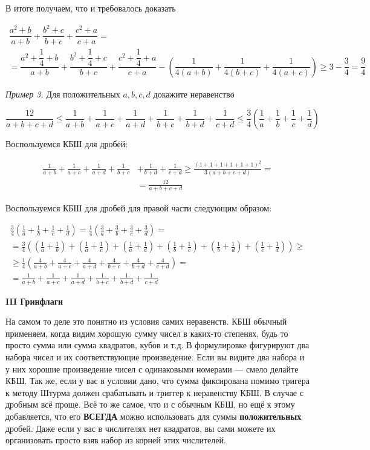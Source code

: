 В итоге получаем, что и требовалось доказать

$$
\begin{gathered}
\dfrac{a^2+b}{a+b}+\dfrac{b^2+c}{b+c}+\dfrac{c^2+a}{c+a}= \\
=\dfrac{a^2+\dfrac{1}{4}+b}{a+b}+\dfrac{b^2+\dfrac{1}{4}+c}{b+c}+\dfrac{c^2+\dfrac{1}{4}+a}{c+a}-\left(\dfrac{1}{4(a+b)}+\dfrac{1}{4(b+c)}+\dfrac{1}{4(a+c)}\right) \geqslant 3-\dfrac{3}{4}=\dfrac{9}{4}
\end{gathered}
$$

\textit{Пример 3.}
Для положительных $a, b, c, d$ докажите неравенство

$$
\frac{12}{a+b+c+d} \leqslant \frac{1}{a+b}+\frac{1}{a+c}+\frac{1}{a+d}+\frac{1}{b+c}+\frac{1}{b+d}+\frac{1}{c+d} \leqslant \frac{3}{4}\left(\frac{1}{a}+\frac{1}{b}+\frac{1}{c}+\frac{1}{d}\right)
$$

Воспользуемся КБШ для дробей:

$$
\begin{aligned}
\frac{1}{a+b}+\frac{1}{a+c}+\frac{1}{a+d}+\frac{1}{b+c} & +\frac{1}{b+d}+\frac{1}{c+d} \geqslant \frac{(1+1+1+1+1+1)^2}{3(a+b+c+d)}= \\
& =\frac{12}{a+b+c+d}
\end{aligned}
$$


Воспользуемся КБШ для дробей для правой части следующим образом:

$$
\begin{gathered}
\frac{3}{4}\left(\frac{1}{a}+\frac{1}{b}+\frac{1}{c}+\frac{1}{d}\right)=\frac{1}{4}\left(\frac{3}{a}+\frac{3}{b}+\frac{3}{c}+\frac{3}{d}\right)= \\
=\frac{3}{4}\left(\left(\frac{1}{a}+\frac{1}{b}\right)+\left(\frac{1}{a}+\frac{1}{c}\right)+\left(\frac{1}{a}+\frac{1}{d}\right)+\left(\frac{1}{b}+\frac{1}{c}\right)+\left(\frac{1}{b}+\frac{1}{d}\right)+\left(\frac{1}{c}+\frac{1}{d}\right)\right) \geqslant \\
\geqslant \frac{1}{4}\left(\frac{4}{a+b}+\frac{4}{a+c}+\frac{4}{a+d}+\frac{4}{b+c}+\frac{4}{b+d}+\frac{4}{c+d}\right)= \\
=\frac{1}{a+b}+\frac{1}{a+c}+\frac{1}{a+d}+\frac{1}{b+c}+\frac{1}{b+d}+\frac{1}{c+d}
\end{gathered}
$$

\textbf{III Гринфлаги}

На самом то деле это понятно из условия самих неравенств. КБШ обычный применяем, когда видим хорошую сумму чисел в каких-то степенях, будь то просто сумма или сумма квадратов, кубов и т.д. В формулировке фигурируют два набора чисел и их соответствующие произведение. Если вы видите два набора и у них хорошие произведение чисел с одинаковыми номерами --- смело делайте КБШ. Так же, если у вас в условии дано, что сумма фиксирована помимо тригера к методу Штурма должен срабатывать и триггер к неравенству КБШ. В случае с дробным всё проще. Всё то же самое, что и с обычным КБШ, но ещё к этому добавляется, что его \textbf{ВСЕГДА} можно использовать для суммы \textbf{положительных} дробей. Даже если у вас в числителях нет квадратов, вы сами можете их организовать просто взяв набор из корней этих числителей.

